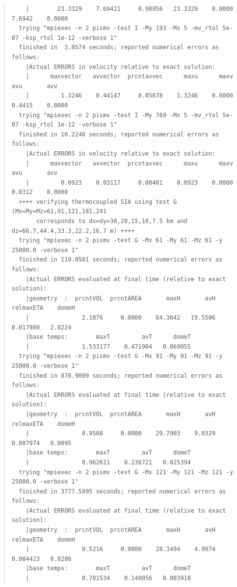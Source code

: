 \documentclass[12pt,final]{amsart}
\begin{document}
\begin{quote}
\begin{verbatim}
    |        23.3329    7.69421     0.98956   23.3329    0.0000    7.6942    0.0000
  trying "mpiexec -n 2 pismv -test I -My 193 -Mx 5 -mv_rtol 5e-07 -ksp_rtol 1e-12 -verbose 1"
  finished in  3.8574 seconds; reported numerical errors as follows:
    |Actual ERRORS in velocity relative to exact solution:
    |      maxvector   avvector  prcntavvec      maxu      maxv       avu       avv
    |         1.3246    0.44147     0.05678    1.3246    0.0000    0.4415    0.0000
  trying "mpiexec -n 2 pismv -test I -My 769 -Mx 5 -mv_rtol 5e-07 -ksp_rtol 1e-12 -verbose 1"
  finished in 16.2246 seconds; reported numerical errors as follows:
    |Actual ERRORS in velocity relative to exact solution:
    |      maxvector   avvector  prcntavvec      maxu      maxv       avu       avv
    |         0.0923    0.03117     0.00401    0.0923    0.0000    0.0312    0.0000
  ++++ verifying thermocoupled SIA using test G (Mx=My=Mz=61,91,121,181,241
       corresponds to dx=dy=30,20,15,10,7.5 km and dz=66.7,44.4,33.3,22.2,16.7 m) ++++
  trying "mpiexec -n 2 pismv -test G -Mx 61 -My 61 -Mz 61 -y 25000.0 -verbose 1"
  finished in 119.0501 seconds; reported numerical errors as follows:
    |Actual ERRORS evaluated at final time (relative to exact solution):
    |geometry  :  prcntVOL  prcntAREA       maxH       avH   relmaxETA    domeH
    |               2.1076     0.0000    64.3642   19.5506    0.017980   2.8224
    |base temps:        maxT         avT      domeT
    |               1.533177    0.471904   0.069055
  trying "mpiexec -n 2 pismv -test G -Mx 91 -My 91 -Mz 91 -y 25000.0 -verbose 1"
  finished in 878.9009 seconds; reported numerical errors as follows:
    |Actual ERRORS evaluated at final time (relative to exact solution):
    |geometry  :  prcntVOL  prcntAREA       maxH       avH   relmaxETA    domeH
    |               0.9508     0.0000    29.7903    9.0329    0.007974   0.0095
    |base temps:        maxT         avT      domeT
    |               0.962611    0.238721   0.025394
  trying "mpiexec -n 2 pismv -test G -Mx 121 -My 121 -Mz 121 -y 25000.0 -verbose 1"
  finished in 3777.5895 seconds; reported numerical errors as follows:
    |Actual ERRORS evaluated at final time (relative to exact solution):
    |geometry  :  prcntVOL  prcntAREA       maxH       avH   relmaxETA    domeH
    |               0.5216     0.0000    28.3494    4.9974    0.004423   0.8286
    |base temps:        maxT         avT      domeT
    |               0.781534    0.140056   0.003918
\end{verbatim}
\end{quote}\normalsize
\end{document}
